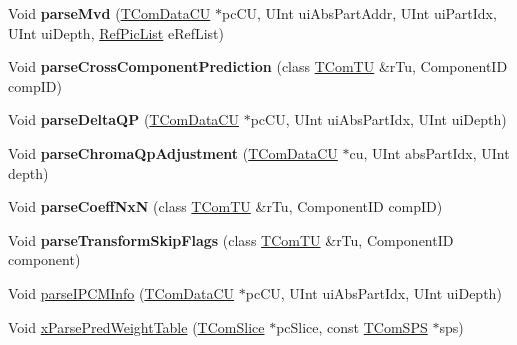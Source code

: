 \begin{DoxyCompactItemize}
\item 
\mbox{\label{class_t_dec_cavlc_afdf7da943bb293f3079140cbf90ea0ea}} 
Void {\bfseries parse\+Mvd} (\hyperlink{class_t_com_data_c_u}{T\+Com\+Data\+CU} $\ast$pc\+CU, U\+Int ui\+Abs\+Part\+Addr, U\+Int ui\+Part\+Idx, U\+Int ui\+Depth, \hyperlink{_type_def_8h_a93cea48eb9dcfd661168dee82e41b384}{Ref\+Pic\+List} e\+Ref\+List)
\item 
\mbox{\label{class_t_dec_cavlc_ac72bad402fa178a79995faf43ebd8ab3}} 
Void {\bfseries parse\+Cross\+Component\+Prediction} (class \hyperlink{class_t_com_t_u}{T\+Com\+TU} \&r\+Tu, Component\+ID comp\+ID)
\item 
\mbox{\label{class_t_dec_cavlc_a100d2e612563313812ca1093c3c807bf}} 
Void {\bfseries parse\+Delta\+QP} (\hyperlink{class_t_com_data_c_u}{T\+Com\+Data\+CU} $\ast$pc\+CU, U\+Int ui\+Abs\+Part\+Idx, U\+Int ui\+Depth)
\item 
\mbox{\label{class_t_dec_cavlc_af6c177bcd9f8305503570541040477be}} 
Void {\bfseries parse\+Chroma\+Qp\+Adjustment} (\hyperlink{class_t_com_data_c_u}{T\+Com\+Data\+CU} $\ast$cu, U\+Int abs\+Part\+Idx, U\+Int depth)
\item 
\mbox{\label{class_t_dec_cavlc_a7185586141582785a4e3e62a48b14e55}} 
Void {\bfseries parse\+Coeff\+NxN} (class \hyperlink{class_t_com_t_u}{T\+Com\+TU} \&r\+Tu, Component\+ID comp\+ID)
\item 
\mbox{\label{class_t_dec_cavlc_a8094c23ad8d152722d0ef837c44cb062}} 
Void {\bfseries parse\+Transform\+Skip\+Flags} (class \hyperlink{class_t_com_t_u}{T\+Com\+TU} \&r\+Tu, Component\+ID component)
\item 
Void \hyperlink{class_t_dec_cavlc_a249435b2acc75eb7b9be1eb0c89f1fed}{parse\+I\+P\+C\+M\+Info} (\hyperlink{class_t_com_data_c_u}{T\+Com\+Data\+CU} $\ast$pc\+CU, U\+Int ui\+Abs\+Part\+Idx, U\+Int ui\+Depth)
\item 
\mbox{\label{class_t_dec_cavlc_a3738f2972f40cce09e62c4d51b6953b9}} 
Void \hyperlink{class_t_dec_cavlc_a3738f2972f40cce09e62c4d51b6953b9}{x\+Parse\+Pred\+Weight\+Table} (\hyperlink{class_t_com_slice}{T\+Com\+Slice} $\ast$pc\+Slice, const \hyperlink{class_t_com_s_p_s}{T\+Com\+S\+PS} $\ast$sps)

\end{DoxyCompactItemize}
